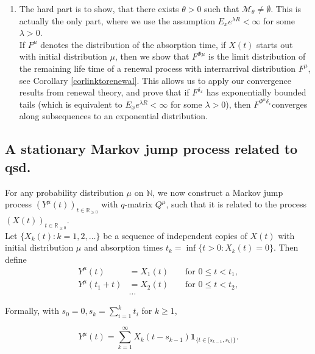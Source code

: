 \documentclass[12pt,a4paper]{scrartcl}
\numberwithin{equation}{section}
\newcommand{\R}{\mathbb{R}} %
\newcommand{\N}{\mathbb{N}} %
\begin{document}
\begin{enumerate}
\item The hard part is to show, that there exists $\theta > 0$ such that $\mathcal{M}_{\theta} \neq \emptyset.$ This is actually the only part, where we use the assumption $E_x e^{\lambda R} < \infty$ for some $\lambda > 0$. \\[1ex]
If $F^{\mu}$ denotes the distribution of the absorption time, if $X\left(t\right)$ starts out with initial distribution $\mu$, then we show that $F^{\Phi\mu}$ is the limit distribution of the remaining life time of a renewal process with interrarrival distribution $F^{\mu}$, see Corollary \ref{corlinktorenewal}. This allows us to apply our convergence results from renewal theory, and prove that if $F^{\delta_x}$ has exponentially bounded tails (which is equivalent to $E_x e^{\lambda R} < \infty$ for some $\lambda > 0$), then $F^{\Phi^n\delta_x}$converges along subsequences to an exponential distribution. 

\end{enumerate}

\subsection{A stationary Markov jump process related to qsd.} \label{sq:constructionofymu}
For any probability distribution $\mu$ on $\N$, we now construct a Markov jump process $\left(Y^{\mu}\left(t\right)\right)_{t \in \R_{\geq 0}}$ with $q$-matrix $Q^{\mu}$, such that it is related to the process $\left(X\left(t\right)\right)_{t \in \R_{\geq 0}}$. \\[2ex]

Let $\lbrace X_k\left(t\right) : k=1,2,\ldots \rbrace  $ be a sequence of independent copies of $ X\left(t\right) $ with initial distribution $\mu$ and absorption times $ t_k = \inf\lbrace t > 0 : X_k\left(t\right) = 0 \rbrace .$  Then define
\begin{align*}
Y^{\mu}\left(t\right) &= X_1\left(t\right) &&\text{ for } 0 \leq t < t_1, \\
Y^{\mu}\left(t_1 + t \right) &= X_2\left(t\right) &&\text{ for } 0 \leq t < t_2, \\
&\ldots
\end{align*}

Formally, with $s_0 = 0, s_k = \sum_{i=1}^k t_i$ for $k\geq 1$,

\begin{equation} \label{eq:ymu}
Y^{\mu}\left(t\right) = \sum_{k=1}^{\infty} X_k\left(t-s_{k-1}\right) \textbf{1}_{\lbrace t \in [s_{k-1}, s_k)\rbrace }.
\end{equation}
\end{document}
